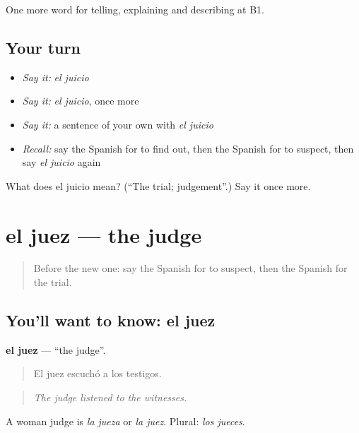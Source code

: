 \begin{grammarlens}[title={What you've built}]
One more word for telling, explaining and describing at B1.
\end{grammarlens}

\subsection*{Your turn}
\begin{itemize}
\raggedright
  \item \emph{Say it:} \emph{el juicio}
  \item \emph{Say it:} \emph{el juicio}, once more
  \item \emph{Say it:} a sentence of your own with \emph{el juicio}
  \item \emph{Recall:} say the Spanish for to find out, then the Spanish for to suspect, then say \emph{el juicio} again
\end{itemize}

\begin{tcolorbox}[breakable,colback=teal!4,colframe=teal!35!black,title={Before you move on}]
What does el juicio mean? (\textquotedblleft{}The trial; judgement\textquotedblright{}.) Say it once more.
\end{tcolorbox}
\section[el juez]{el juez — the judge}

\label{lesson:ES-C522-juez}



\begin{quote}
Before the new one: say the Spanish for to suspect, then the Spanish for the trial.
\end{quote}

\subsection*{You'll want to know: el juez}
\textbf{el juez} — \textquotedblleft{}the judge\textquotedblright{}.

\begin{quote}
El juez escuchó a los testigos.
\end{quote}

\begin{quote}
\emph{The judge listened to the witnesses.}
\end{quote}

A woman judge is \emph{la jueza} or \emph{la juez}. Plural: \emph{los jueces}.

